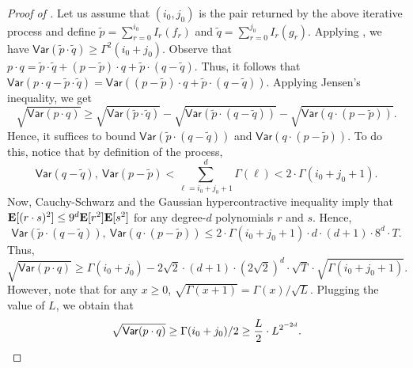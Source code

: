 \documentclass{toc}
\newcommand{\E}{{\bf E}}
\begin{document}
\begin{proof}[Proof of ]
Let us assume that $(i_0, j_0)$ is the pair returned by the above iterative process and define $\tilde{p} = \sum_{r=0}^{i_0} I_r(f_r)$ and $\tilde{q} = \sum_{r=0}^{j_0} I_r(g_r)$. Applying , we have
$
\mathsf{Var}(\tilde{p} \cdot \tilde{q}) \ge {\Gamma^2(i_0+j_0)}. 
$
Observe that $p \cdot q = \tilde{p} \cdot \tilde{q} + (p - \tilde{p}) \cdot q + \tilde{p} \cdot (q-\tilde{q})$. Thus, it follows that $\mathsf{Var}(p \cdot q - \tilde{p} \cdot \tilde{q}) = \mathsf{Var}((p - \tilde{p}) \cdot q + \tilde{p} \cdot (q-\tilde{q}))$. Applying Jensen's inequality, we get
\[
\sqrt{\mathsf{Var}(p \cdot q)} \ge \sqrt{\mathsf{Var}(\tilde{p} \cdot \tilde{q})} - \sqrt{\mathsf{Var}(\tilde{p} \cdot {(q-\tilde{q})})} - \sqrt{\mathsf{Var}(q \cdot {(p-\tilde{p})})}.\]
Hence, it suffices to bound $\mathsf{Var}(\tilde{p} \cdot {(q-\tilde{q})})$ and $\mathsf{Var}(q \cdot {(p-\tilde{p})})$. To do this, notice that by definition of the process, 
\[
\mathsf{Var}(q-\tilde{q}), \ \mathsf{Var}(p-\tilde{p}) < \sum_{\ell = i_0 +j_0+1}^{d} \Gamma(\ell) <  2 \cdot \Gamma(i_0+j_0+1). 
\]
Now, Cauchy-Schwarz and the Gaussian hypercontractive inequality imply that
$\E[(r\cdot s)^2] \le 9^d \E[r^2] \E [s^2]$ for any degree-$d$ polynomials $r$ and $s$.
Hence,
\[
\mathsf{Var}(\tilde p \cdot {(q-\tilde{q})}), \  \mathsf{Var}(q \cdot {(p-\tilde{p})})\le 2 \cdot \Gamma(i_0+j_0+1) \cdot d \cdot (d+1) \cdot 8^d \cdot T. 
\]
Thus, 
\[
\sqrt{\mathsf{Var}(p \cdot q)} \ge {\Gamma(i_0+j_0)} - 2 \sqrt{2} \cdot (d+1) \cdot (2\sqrt{2})^d \cdot \sqrt{T} \cdot \sqrt{\Gamma(i_0+j_0+1)}.
\]
However, note that for any $x \ge 0$, $\sqrt{\Gamma(x+1) } = \Gamma(x) / \sqrt{L}$. Plugging the value of $L$, we obtain that 
\[
\sqrt{\mathsf{Var}(p \cdot q)}  \ge {\Gamma(i_0+j_0)}/2 \ge \frac{L}{2} \cdot L^{2^{-2d}}. \qedhere
\]
%
%
%
%
%
%
%
%
%
%
%
%
%
%
%
%
%
%
%
%
%
%
\end{proof}
\end{document}
